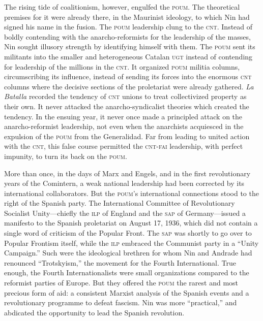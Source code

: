 The rising tide of coalitionism, however, engulfed the \textsc{poum}. The theoretical premises for it were already there, in the Maurinist ideology, to which Nin had signed his name in the fusion. The \textsc{poum} leadership clung to the \textsc{cnt}. Instead of boldly contending with the anarcho-reformists for the leadership of the masses, Nin sought illusory strength by identifying himself with them. The \textsc{poum} sent its militants into the smaller and heterogeneous Catalan \textsc{ugt} instead of contending for leadership of the millions in the \textsc{cnt}. It organized \textsc{poum} militia columns, circumscribing its influence, instead of sending its forces into the enormous \textsc{cnt} columns where the decisive sections of the proletariat were already gathered. \emph{La Batalla} recorded the tendency of \textsc{cnt} unions to treat collectivized property as their own. It never attacked the anarcho-syndicalist theories which created the tendency. In the ensuing year, it never once made a principled attack on the anarcho-reformist leadership, not even when the anarchists acquiesced in the expulsion of the \textsc{poum} from the Generalidad. Far from leading to united action with the \textsc{cnt}, this false course permitted the \textsc{cnt-fai} leadership, with perfect impunity, to turn its back on the \textsc{poum}.

More than once, in the days of Marx and Engels, and in the first revolutionary years of the Comintern, a weak national leadership had been corrected by its international collaborators. But the \textsc{poum}’s international connections stood to the right of the Spanish party. The {International Committee of Revolutionary Socialist Unity}---chiefly the \textsc{ilp} of England and the \textsc{sap} of Germany---issued a manifesto to the Spanish proletariat on August 17, 1936, which did not contain a single word of criticism of the Popular Front. The \textsc{sap} was shortly to go over to Popular Frontism itself, while the \textsc{ilp} embraced the Communist party in a ``Unity Campaign.'' Such were the ideological brethren for whom Nin and Andrade had renounced ``Trotskyism,'' the movement for the Fourth International. True enough, the Fourth Internationalists were small organizations compared to the reformist parties of Europe. But they offered the \textsc{poum} the rarest and most precious form of aid: a consistent Marxist analysis of the Spanish events and a revolutionary programme to defeat fascism. Nin was more ``practical,'' and abdicated the opportunity to lead the Spanish revolution.